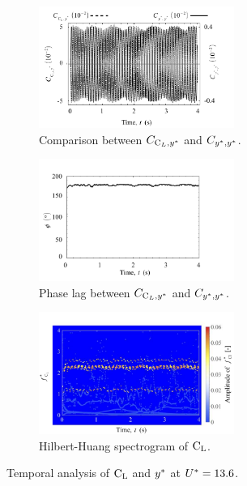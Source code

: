 \documentclass[oneside]{utmthesis}
\begin{document}
\begin{figure}[H]
  \centering
  \begin{subfigure}[h]{1\textwidth}
    \hspace{2.4cm}
    \includegraphics[width=0.7\textwidth]{figs/tempAnalysisLower-a}
    \caption{Comparison between $C_{\text{C}_{L},y^{*}}$ and $C_{y^{*},y^{*}}$.}
    \label{fig:tempAnalysisLower-a}
  \end{subfigure}

  \begin{subfigure}[h]{1\textwidth}
    \hspace{2.4cm}
    \includegraphics[width=0.7\textwidth]{figs/tempAnalysisLower-b}
    \caption{Phase lag between $C_{\text{C}_{L},y^{*}}$ and $C_{y^{*},y^{*}}$.}
    \label{fig:tempAnalysisLower-b}
  \end{subfigure}

  \begin{subfigure}[h]{1\textwidth}
    \hspace{2.4cm}
    \includegraphics[width=0.7\textwidth]{figs/tempAnalysisLower-c}
    \caption{Hilbert-Huang spectrogram of $\text{C}_{\text{L}}$.}
    \label{fig:tempAnalysisLower-c}
  \end{subfigure}
  \caption{Temporal analysis of $\text{C}_{\text{L}}$ and $y^{*}$ at $U^{*} = 13.6$.} \label{fig:tempAnalysisLower}
\end{figure}
\end{document}
